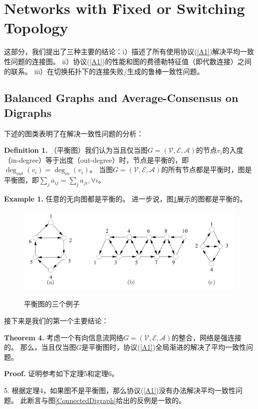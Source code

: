 \documentclass{article}
\begin{document}
\section{Networks with Fixed or Switching Topology}
这部分，我们提出了三种主要的结论：i）描述了所有使用协议(\ref{A1})解决平均一致性问题的连接图。
ii）协议(\ref{A1})的性能和图的费德勒特征值（即代数连接）之间的联系。
iii）在切换拓扑下的连接失败/生成的鲁棒一致性问题。

\subsection{Balanced Graphs and Average-Consensus on Digraphs}
下述的图类表明了在解决一致性问题的分析：

\noindent \textbf{Definition 1.} （平衡图）我们认为当且仅当图$G=(\mathcal{V}, \mathcal{E}, \mathcal{A})$的节点$v_i$的入度（in-degree）等于出度（out-degree）时，节点是平衡的，即$\deg_{out}(v_i)=\deg_{in}(v_i)$。
当图$G=(\mathcal{V}, \mathcal{E}, \mathcal{A})$的所有节点都是平衡时，图是平衡图，即$\sum_{j}a_{ij} = \sum_{j}a_{ji}, \forall i$。

\noindent \textbf{Example 1.} 任意的无向图都是平衡的。
进一步说，图\ref{BalancedGraphs}展示的图都是平衡的。
\begin{figure}[htbp]
    \centering
    \includegraphics[width=12cm]{figures/Fig3-BalancedGraphs.jpeg}
    \label{BalancedGraphs}
    \caption{平衡图的三个例子}
\end{figure}

接下来是我们的第一个主要结论：

\noindent \textbf{Theorem 4.} 考虑一个有向信息流网络$G=(\mathcal{V}, \mathcal{E}, \mathcal{A})$的整合，网络是强连接的。
那么，当且仅当图$G$是平衡图时，协议(\ref{A1})全局渐进的解决了平均一致性问题。

\noindent \textbf{Proof.} 证明参考如下定理5和定理6。

 5. 根据定理4，如果图不是平衡图，那么协议(\ref{A1})没有办法解决平均一致性问题。
此断言与图\ref{ConnectedDigraph}给出的反例是一致的。
\end{document}
